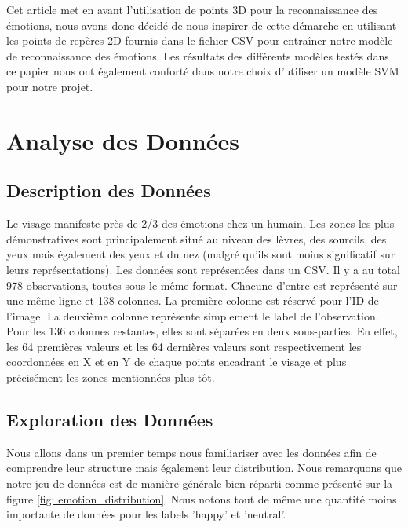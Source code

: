 \documentclass{rapport}
\begin{document}
Cet article met en avant l'utilisation de points 3D pour la reconnaissance des émotions, nous avons donc décidé de nous inspirer de cette démarche en utilisant
les points de repères 2D fournis dans le fichier CSV pour entraîner notre modèle de reconnaissance des émotions. Les résultats des différents modèles testés dans
ce papier nous ont également conforté dans notre choix d'utiliser un modèle SVM pour notre projet.

\section{Analyse des Données}
\subsection{Description des Données}

Le visage manifeste près de 2/3 des émotions chez un humain. \cite{koBriefReviewFacial2018}
Les zones les plus démonstratives sont
principalement situé au niveau des lèvres, des sourcils, des yeux mais
également des yeux et du nez (malgré qu'ils sont moins significatif sur leurs
représentations). \cite{koBriefReviewFacial2018} Les données sont représentées dans
un CSV. Il y a au total 978 observations, toutes sous le même format. Chacune
d'entre est représenté sur une même ligne et 138 colonnes. La première colonne
est réservé pour l'ID de l'image. La deuxième colonne représente simplement le
label de l'observation. Pour les 136 colonnes restantes, elles sont séparées
en deux sous-parties. En effet, les 64 premières valeurs et les 64 dernières
valeurs sont respectivement les coordonnées en X et en Y de chaque points
encadrant le visage et plus précisément les zones mentionnées plus tôt.

\subsection{Exploration des Données}

Nous allons dans un premier temps nous familiariser avec les données afin de comprendre leur structure
mais également leur distribution. Nous remarquons que notre jeu de données est de manière générale bien
réparti comme présenté sur la figure \ref*{fig: emotion_distribution}. Nous notons tout de même une quantité
moins importante de données pour les labels 'happy' et 'neutral'.
\end{document}
